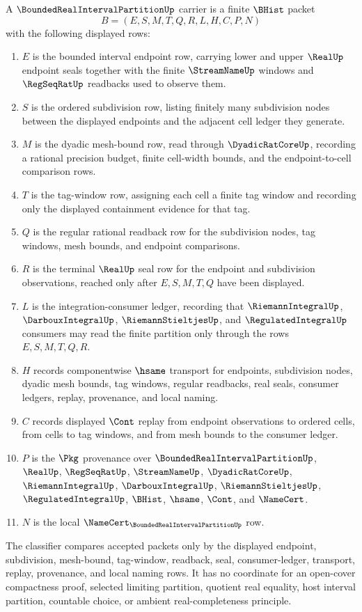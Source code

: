 \begin{definition}
\label{def:bounded-real-interval-partition-carrier}
A $\BoundedRealIntervalPartitionUp$ carrier is a finite $\BHist$ packet
$$
B=(E,S,M,T,Q,R,L,H,C,P,N)
$$
with the following displayed rows:
\begin{enumerate}
\item $E$ is the bounded interval endpoint row, carrying lower and upper $\RealUp$ endpoint seals together with the finite $\StreamNameUp$ windows and $\RegSeqRatUp$ readbacks used to observe them.
\item $S$ is the ordered subdivision row, listing finitely many subdivision nodes between the displayed endpoints and the adjacent cell ledger they generate.
\item $M$ is the dyadic mesh-bound row, read through $\DyadicRatCoreUp$, recording a rational precision budget, finite cell-width bounds, and the endpoint-to-cell comparison rows.
\item $T$ is the tag-window row, assigning each cell a finite tag window and recording only the displayed containment evidence for that tag.
\item $Q$ is the regular rational readback row for the subdivision nodes, tag windows, mesh bounds, and endpoint comparisons.
\item $R$ is the terminal $\RealUp$ seal row for the endpoint and subdivision observations, reached only after $E,S,M,T,Q$ have been displayed.
\item $L$ is the integration-consumer ledger, recording that $\RiemannIntegralUp$, $\DarbouxIntegralUp$, $\RiemannStieltjesUp$, and $\RegulatedIntegralUp$ consumers may read the finite partition only through the rows $E,S,M,T,Q,R$.
\item $H$ records componentwise $\hsame$ transport for endpoints, subdivision nodes, dyadic mesh bounds, tag windows, regular readbacks, real seals, consumer ledgers, replay, provenance, and local naming.
\item $C$ records displayed $\Cont$ replay from endpoint observations to ordered cells, from cells to tag windows, and from mesh bounds to the consumer ledger.
\item $P$ is the $\Pkg$ provenance over $\BoundedRealIntervalPartitionUp$, $\RealUp$, $\RegSeqRatUp$, $\StreamNameUp$, $\DyadicRatCoreUp$, $\RiemannIntegralUp$, $\DarbouxIntegralUp$, $\RiemannStieltjesUp$, $\RegulatedIntegralUp$, $\BHist$, $\hsame$, $\Cont$, and $\NameCert$.
\item $N$ is the local $\NameCert_{\BoundedRealIntervalPartitionUp}$ row.
\end{enumerate}
The classifier compares accepted packets only by the displayed endpoint, subdivision, mesh-bound, tag-window, readback, seal, consumer-ledger, transport, replay, provenance, and local naming rows. It has no coordinate for an open-cover compactness proof, selected limiting partition, quotient real equality, host interval partition, countable choice, or ambient real-completeness principle.
\end{definition}

